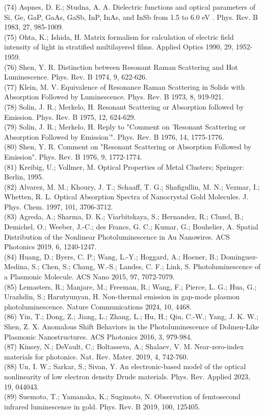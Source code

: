 \documentclass[10pt]{article}
\begin{document}
(74) Aspnes, D. E.; Studna, A. A. Dielectric functions and optical parameters of Si, Ge, GaP, GaAs, GaSb, InP, InAs, and InSb from 1.5 to 6.0 eV . Phys. Rev. B 1983, 27, 985-1009.\\
(75) Ohta, K.; Ishida, H. Matrix formalism for calculation of electric field intensity of light in stratified multilayered films. Applied Optics 1990, 29, 1952-1959.\\
(76) Shen, Y. R. Distinction between Resonant Raman Scattering and Hot Luminescence. Phys. Rev. B 1974, 9, 622-626.\\
(77) Klein, M. V. Equivalence of Resonance Raman Scattering in Solids with Absorption Followed by Luminescence. Phys. Rev. B 1973, 8, 919-921.\\
(78) Solin, J. R.; Merkelo, H. Resonant Scattering or Absorption followed by Emission. Phys. Rev. B 1975, 12, 624-629.\\
(79) Solin, J. R.; Merkelo, H. Reply to "Comment on 'Resonant Scattering or Absorption Followed by Emission'". Phys. Rev. B 1976, 14, 1775-1776.\\
(80) Shen, Y. R. Comment on "Resonant Scattering or Absorption Followed by Emission". Phys. Rev. B 1976, 9, 1772-1774.\\
(81) Kreibig, U.; Vollmer, M. Optical Properties of Metal Clusters; Springer: Berlin, 1995.\\
(82) Alvarez, M. M.; Khoury, J. T.; Schaaff, T. G.; Shafigullin, M. N.; Vezmar, I.; Whetten, R. L. Optical Absorption Spectra of Nanocrystal Gold Molecules. J. Phys. Chem. 1997, 101, 3706-3712.\\
(83) Agreda, A.; Sharma, D. K.; Viarbitskaya, S.; Hernandez, R.; Cluzel, B.; Demichel, O.; Weeber, J.-C.; des Francs, G. C.; Kumar, G.; Bouhelier, A. Spatial Distribution of the Nonlinear Photoluminescence in Au Nanowires. ACS Photonics 2019, 6, 1240-1247.\\
(84) Huang, D.; Byers, C. P.; Wang, L.-Y.; Hoggard, A.; Hoener, B.; Dominguez-Medina, S.; Chen, S.; Chang, W.-S.; Landes, C. F.; Link, S. Photoluminescence of a Plasmonic Molecule. ACS Nano 2015, 97, 7072-7079.\\
(85) Lemasters, R.; Manjare, M.; Freeman, R.; Wang, F.; Pierce, L. G.; Hua, G.; Urazhdin, S.; Harutyunyan, H. Non-thermal emission in gap-mode plasmon photoluminescence. Nature Communications 2024, 10, 4468.\\
(86) Yin, T.; Dong, Z.; Jiang, L.; Zhang, L.; Hu, H.; Qiu, C.-W.; Yang, J. K. W.; Shen, Z. X. Anomalous Shift Behaviors in the Photoluminescence of Dolmen-Like Plasmonic Nanostructures. ACS Photonics 2016, 3, 979-984.\\
(87) Kinsey, N.; DeVault, C.; Boltasseva, A.; Shalaev, V. M. Near-zero-index materials for photonics. Nat. Rev. Mater. 2019, 4, 742-760.\\
(88) Un, I. W.; Sarkar, S.; Sivan, Y. An electronic-based model of the optical nonlinearity of low electron density Drude materials. Phys. Rev. Applied 2023, 19, 044043.\\
(89) Suemoto, T.; Yamanaka, K.; Sugimoto, N. Observation of femtosecond infrared luminescence in gold. Phys. Rev. B 2019, 100, 125405.
\end{document}
